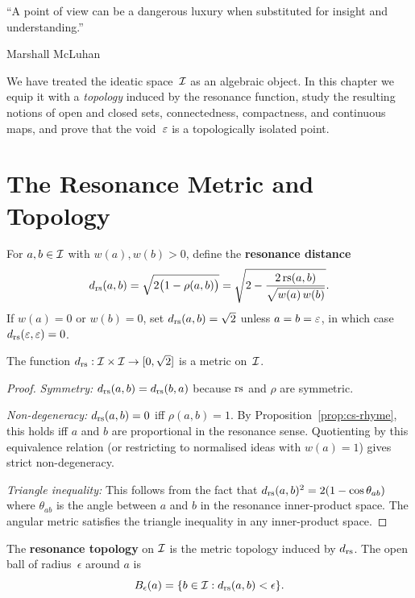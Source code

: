 \epigraph{``A point of view can be a dangerous luxury when
substituted for insight and understanding.''}{Marshall McLuhan}

We have treated the ideatic space~$\mathcal{I}$ as an algebraic object.
In this chapter we equip it with a \emph{topology} induced by the
resonance function, study the resulting notions of open and closed
sets, connectedness, compactness, and continuous maps, and prove
that the void~$\varepsilon$ is a topologically isolated point.

\section{The Resonance Metric and Topology}
\label{sec:resonance-topology}

\begin{definition}
\label{def:resonance-distance}
For $a, b \in \mathcal{I}$ with $w(a), w(b) > 0$, define the
\textbf{resonance distance}
\[
  d_{\mathrm{rs}}(a,b)
  = \sqrt{2\bigl(1 - \rho(a,b)\bigr)}
  = \sqrt{2 - \frac{2\,\mathrm{rs}(a,b)}{\sqrt{w(a)\,w(b)}}}.
\]
If $w(a)=0$ or $w(b)=0$, set $d_{\mathrm{rs}}(a,b) = \sqrt{2}$ unless
$a = b = \varepsilon$, in which case $d_{\mathrm{rs}}(\varepsilon,\varepsilon) = 0$.
\end{definition}

\begin{proposition}[$d_{\rs}$ is a metric]
\label{prop:metric}
The function $d_{\mathrm{rs}} : \mathcal{I} \times \mathcal{I} \to [0,\sqrt{2}]$ is a
metric on~$\mathcal{I}$.
\end{proposition}

\begin{proof}
\emph{Symmetry:} $d_{\mathrm{rs}}(a,b) = d_{\mathrm{rs}}(b,a)$ because $\mathrm{rs}$ and
$\rho$ are symmetric.

\emph{Non-degeneracy:} $d_{\mathrm{rs}}(a,b) = 0$ iff $\rho(a,b) = 1$.
By Proposition~\ref{prop:cs-rhyme}, this holds iff $a$ and $b$
are proportional in the resonance sense.  Quotienting by this
equivalence relation (or restricting to normalised ideas with
$w(a) = 1$) gives strict non-degeneracy.

\emph{Triangle inequality:} This follows from the fact that
$d_{\mathrm{rs}}(a,b)^2 = 2(1-\cos\theta_{ab})$ where $\theta_{ab}$
is the angle between $a$ and $b$ in the resonance inner-product
space.  The angular metric satisfies the triangle inequality in
any inner-product space.
\end{proof}

\begin{definition}
\label{def:resonance-topology}
The \textbf{resonance topology} on $\mathcal{I}$ is the metric topology
induced by $d_{\rs}$.  The open ball of radius~$\epsilon$ around
$a$ is
\[
  B_\epsilon(a) = \{b \in \mathcal{I} : d_{\mathrm{rs}}(a,b) < \epsilon\}.
\]
\end{definition}

